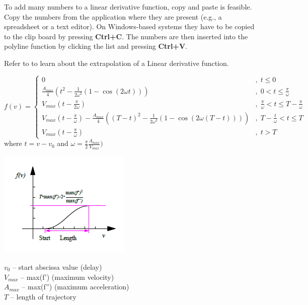 To add many numbers to a linear derivative function, copy and paste is feasible.
Copy the numbers from the application where they are present
(e.g., a spreadsheet or a text editor). On Windows-based systems they have to be
copied to the clip board by pressing \textbf{Ctrl+C}.
The numbers are then inserted into the polyline function by clicking the list
and pressing \textbf{Ctrl+V}.

Refer to 
to learn about the extrapolation of a Linear derivative function.

\clearpage
{}

{\small $$
  f(v)=\left\{\begin{array}{ll}
    0 &,\; t \leq 0 \\[1mm]
    \frac{A_{max}}{4}\left(
      t^2-\frac{1}{2\omega^2}(1-\cos(2\omega t))\right)
      &,\; 0 < t \leq \frac{\pi}{\omega} \\[1mm]
    V_{max}\left(t-\frac{\pi}{2\omega}\right)
      &,\; \frac{\pi}{\omega} < t \leq T-\frac{\pi}{\omega} \\[1mm]
    V_{max}\left(t-\frac{\pi}{\omega}\right) -
      \frac{A_{max}}{4}\left((T-t)^2-\frac{1}{2\omega^2}(1-\cos(2\omega(T-t)))\right)
      \!\!\!\!&,\; T-\frac{t}{\omega} < t \leq T \\[1mm]
    V_{max}\left(t-\frac{\pi}{\omega}\right)
      &,\; t > T
    \end{array}\right.
$$}
where $t=v-v_0$ and $\omega=\frac{\pi}{2}\frac{A_{max}}{V_{max}})$

\noindent
\begin{minipage}{0.45\textwidth}
  \includegraphics[width=\textwidth]{Figures/4-Functions_SmoothTrajectory.png}
\end{minipage}%
\begin{minipage}{0.55\textwidth}
  $v_0$ -- start abscissa value (delay) \\
  $V_{max}$ -- max(f') (maximum velocity) \\
  $A_{max}$ -- max(f'') (maximum acceleration) \\
  $T$ -- length of trajectory
\end{minipage}

